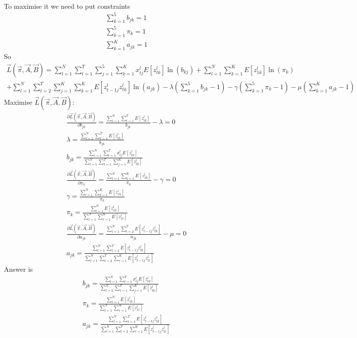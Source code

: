 \documentclass[12pt,twoside]{article}
\begin{document}
\begin{enumerate}[(i)]
\begin{align}
\end{align}
To maximise it we need to put constraints
\begin{align}
\sum_{k=1}^{5} b_{jk} = 1\\
\sum_{k=1}^{5} \pi_k = 1\\
\sum_{k=1}^{K} a_{jk} = 1
\end{align}
So
\begin{align}
\vec{L}(\vec{\pi}, \vec{A} , \vec{B}) =  \sum_{l=1}^{N} \sum_{t=1}^{T} \sum_{j=1}^5 \sum_{k=1}^K x_{tj}^l E[z_{tk}^l] \ln (b_{kj})  + \sum_{l=1}^{N} \sum_{k=1}^K E[z_{1k}^l] \ln (\pi_k) \\
+ \sum_{l=1}^{N} \sum_{t=2}^{T} \sum_{j=1}^K \sum_{k=1}^K E[z_{t-1j}^l  z_{tk}^l] \ln (a_{jk}) - \lambda (  \sum_{k=1}^{5} b_{jk} -1 ) - \gamma (\sum_{k=1}^{5} \pi_k - 1) - \mu (\sum_{k=1}^{K} a_{jk} - 1)
\end{align}
Maximise $\vec{L}(\vec{\pi},\vec{A},\vec{B})$:
\begin{align}
\frac{\partial \vec{L}(\vec{\pi}, \vec{A}, \vec{B})}{\partial  b_{jk}} = \frac{\sum_{l=1}^{N} \sum_{t=1}^{T} E[z_{tk}^l]}{b_{jk}} - \lambda = 0 \\
\lambda = \frac{\sum_{l=1}^{N} \sum_{t=1}^{T} E[z_{tk}^l]}{b_{jk}} \\
b_{jk} = \frac{\sum_{l=1}^{N} \sum_{t=1}^{T} x_{tj}^l E[z_{tk}^l]}{\sum_{l=1}^{N} \sum_{t=1}^{T} \sum_{j=1}^K E[z_{tk}^l]}\\
\frac{\partial \vec{L}(\vec{\pi}, \vec{A}, \vec{B})}{\partial  \pi_k} = \frac{\sum_{l=1}^{N} \sum_{k=1}^K E[z_{1k}^l] }{\pi_k}- \gamma = 0\\ 
\gamma = \frac{\sum_{l=1}^{N} \sum_{k=1}^K E[z_{1k}^l] }{\pi_k} \\
\pi_k = \frac{\sum_{l=1}^{N} E[z_{1k}^l]}{\sum_{l=1}^{N} \sum_{r=1}^K E[z_{1r}^l]} \\
\frac{\partial \vec{L}(\vec{\pi}, \vec{A}, \vec{B})}{\partial  a_{jk}} =  \frac{\sum_{l=1}^{N} \sum_{t=2}^{T} E[z_{t-1j}^l  z_{tk}^l]}{a_{jk}}- \mu = 0\\
a_{jk} = \frac{\sum_{l=1}^{N} \sum_{t=2}^{T} E[z_{t-1j}^l  z_{tk}^l]}{\sum_{l=1}^{N} \sum_{t=2}^{T} \sum_{r=1}^K E[z_{t-1j}^l  z_{tr}^l]} 
\end{align}
Answer is
\begin{align}
b_{jk} = \frac{\sum_{l=1}^{N} \sum_{t=1}^{T} x_{tj}^l E[z_{tk}^l]}{\sum_{l=1}^{N} \sum_{t=1}^{T} \sum_{j=1}^K E[z_{tk}^l]}\\
\pi_k = \frac{\sum_{l=1}^{N} E[z_{1k}^l]}{\sum_{l=1}^{N} \sum_{r=1}^K E[z_{1r}^l]} \\
a_{jk} = \frac{\sum_{l=1}^{N} \sum_{t=2}^{T} E[z_{t-1j}^l  z_{tk}^l]}{\sum_{l=1}^{N} \sum_{t=2}^{T} \sum_{r=1}^K E[z_{t-1j}^l  z_{tr}^l]}
\end{align}

\end{enumerate}
\end{document}
